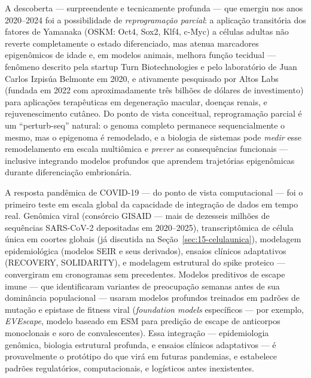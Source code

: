 A descoberta --- surpreendente e tecnicamente profunda --- que emergiu nos anos 2020--2024 foi a possibilidade de \emph{reprogramação parcial}: a aplicação transitória dos fatores de Yamanaka (OSKM: Oct4, Sox2, Klf4, c-Myc) a células adultas não reverte completamente o estado diferenciado, mas atenua marcadores epigenômicos de idade e, em modelos animais, melhora função tecidual --- fenômeno descrito pela startup Turn Biotechnologies e pelo laboratório de Juan Carlos Izpisúa Belmonte em 2020, e ativamente pesquisado por Altos Labs (fundada em 2022 com aproximadamente três bilhões de dólares de investimento) para aplicações terapêuticas em degeneração macular, doenças renais, e rejuvenescimento cutâneo. Do ponto de vista conceitual, reprogramação parcial é um ``perturb-seq'' natural: o genoma completo permanece sequencialmente o mesmo, mas o epigenoma é remodelado, e a biologia de sistemas pode \emph{medir} esse remodelamento em escala multiômica e \emph{prever} as consequências funcionais --- inclusive integrando modelos profundos que aprendem trajetórias epigenômicas durante diferenciação embrionária.




A resposta pandêmica de COVID-19 --- do ponto de vista computacional --- foi o primeiro teste em escala global da capacidade de integração de dados em tempo real. Genômica viral (consórcio GISAID --- mais de dezesseis milhões de sequências SARS-CoV-2 depositadas em 2020--2025), transcriptômica de célula única em coortes globais (já discutida na Seção~\ref{sec:15-celulaunica}), modelagem epidemiológica (modelos SEIR e seus derivados), ensaios clínicos adaptativos (RECOVERY, SOLIDARITY), e modelagem estrutural do spike proteico --- convergiram em cronogramas sem precedentes. Modelos preditivos de escape imune --- que identificaram variantes de preocupação semanas antes de sua dominância populacional --- usaram modelos profundos treinados em padrões de mutação e epistase de fitness viral (\emph{foundation models} específicos --- por exemplo, \emph{EVEscape}, modelo baseado em ESM para predição de escape de anticorpos monoclonais e soro de convalescentes). Essa integração --- epidemiologia genômica, biologia estrutural profunda, e ensaios clínicos adaptativos --- é provavelmente o protótipo do que virá em futuras pandemias, e estabelece padrões regulatórios, computacionais, e logísticos antes inexistentes.

